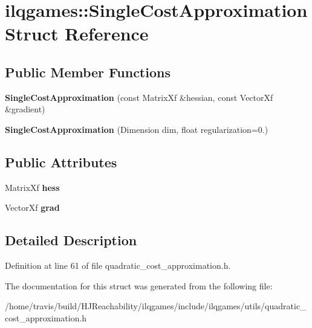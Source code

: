 \hypertarget{structilqgames_1_1_single_cost_approximation}{}\section{ilqgames\+:\+:Single\+Cost\+Approximation Struct Reference}
\label{structilqgames_1_1_single_cost_approximation}
\subsection*{Public Member Functions}
\begin{DoxyCompactItemize}
\item 
{\bfseries Single\+Cost\+Approximation} (const Matrix\+Xf \&hessian, const Vector\+Xf \&gradient)\hypertarget{structilqgames_1_1_single_cost_approximation_a33cb225c90ccecd41aeb0bb21e6f8205}{}\label{structilqgames_1_1_single_cost_approximation_a33cb225c90ccecd41aeb0bb21e6f8205}

\item 
{\bfseries Single\+Cost\+Approximation} (Dimension dim, float regularization=0.)\hypertarget{structilqgames_1_1_single_cost_approximation_af0031622bb059b5728e48d28310563d5}{}\label{structilqgames_1_1_single_cost_approximation_af0031622bb059b5728e48d28310563d5}

\end{DoxyCompactItemize}
\subsection*{Public Attributes}
\begin{DoxyCompactItemize}
\item 
Matrix\+Xf {\bfseries hess}\hypertarget{structilqgames_1_1_single_cost_approximation_aa450efcc9c0b0c13fa59f4d8b237b5a5}{}\label{structilqgames_1_1_single_cost_approximation_aa450efcc9c0b0c13fa59f4d8b237b5a5}

\item 
Vector\+Xf {\bfseries grad}\hypertarget{structilqgames_1_1_single_cost_approximation_adc376709ff1a00a82eb713e9c56fb4e8}{}\label{structilqgames_1_1_single_cost_approximation_adc376709ff1a00a82eb713e9c56fb4e8}

\end{DoxyCompactItemize}


\subsection{Detailed Description}


Definition at line 61 of file quadratic\+\_\+cost\+\_\+approximation.\+h.



The documentation for this struct was generated from the following file\+:\begin{DoxyCompactItemize}
\item 
/home/travis/build/\+H\+J\+Reachability/ilqgames/include/ilqgames/utils/quadratic\+\_\+cost\+\_\+approximation.\+h\end{DoxyCompactItemize}

